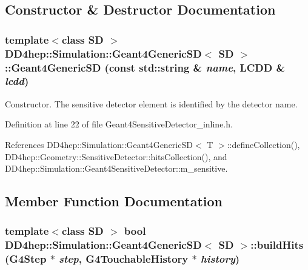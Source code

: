 \subsection{Constructor \& Destructor Documentation}
\hypertarget{class_d_d4hep_1_1_simulation_1_1_geant4_generic_s_d_a7ce3d1272f106b20f2f92e50fa2e1996}{
\subsubsection[{Geant4GenericSD}]{\setlength{\rightskip}{0pt plus 5cm}template$<$class SD $>$ {\bf DD4hep::Simulation::Geant4GenericSD}$<$ SD $>$::{\bf Geant4GenericSD} (const std::string \& {\em name}, \/  {\bf LCDD} \& {\em lcdd})}}
\label{class_d_d4hep_1_1_simulation_1_1_geant4_generic_s_d_a7ce3d1272f106b20f2f92e50fa2e1996}


Constructor. The sensitive detector element is identified by the detector name. 

Definition at line 22 of file Geant4SensitiveDetector\_\-inline.h.

References DD4hep::Simulation::Geant4GenericSD$<$ T $>$::defineCollection(), DD4hep::Geometry::SensitiveDetector::hitsCollection(), and DD4hep::Simulation::Geant4SensitiveDetector::m\_\-sensitive.

\subsection{Member Function Documentation}
\hypertarget{class_d_d4hep_1_1_simulation_1_1_geant4_generic_s_d_a72d6c9cb683b9a0bd58fdbd17dc94be6}{
\subsubsection[{buildHits}]{\setlength{\rightskip}{0pt plus 5cm}template$<$class SD $>$ bool {\bf DD4hep::Simulation::Geant4GenericSD}$<$ SD $>$::buildHits (G4Step $\ast$ {\em step}, \/  G4TouchableHistory $\ast$ {\em history})}}
\label{class_d_d4hep_1_1_simulation_1_1_geant4_generic_s_d_a72d6c9cb683b9a0bd58fdbd17dc94be6}


